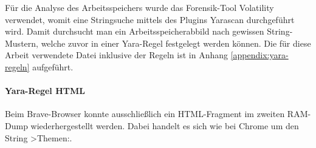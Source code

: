 Für die Analyse des Arbeitsspeichers wurde das Forensik-Tool Volatility verwendet, womit eine Stringsuche mittels des Plugins Yarascan durchgeführt wird. Damit durchsucht man ein Arbeitsspeicherabbild nach gewissen String-Mustern, welche zuvor in einer Yara-Regel festgelegt werden können. Die für diese Arbeit verwendete Datei inklusive der Regeln ist in Anhang \ref{appendix:yara-regeln} aufgeführt. 

\paragraph*{Yara-Regel \glqq{}HTML\grqq{}}\label{chap:ergebnisse-brave-uncommon-locations-volatility-html}

Beim Brave-Browser konnte ausschließlich ein HTML-Fragment im zweiten RAM-Dump wiederhergestellt werden. Dabei handelt es sich wie bei Chrome um den String \glqq{}>Themen:\grqq.

